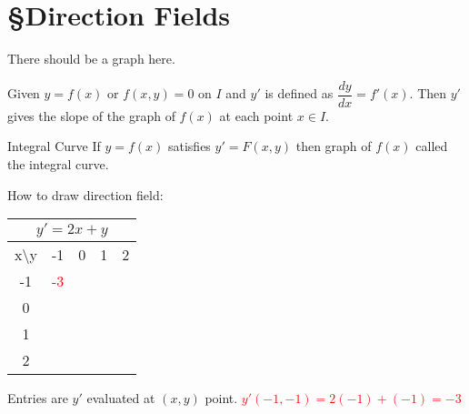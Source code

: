 \section{\S Direction Fields}
\begin{note}
There should be a graph here.
\end{note}
Given $y=f(x)$ or $f(x,y)=0$ on $I$ and $y'$ is defined as $\dfrac{dy}{dx}=f'(x)$. Then $y'$ gives the slope of the graph of $f(x)$ at each point $x \in I$.
\begin{imp:defn}{Integral Curve}{} If $y=f(x)$ satisfies $y'=F(x,y)$ then graph of $f(x)$ called the integral curve.
\end{imp:defn}
\begin{ex}
How to draw direction field:
\begin{center}
 \begin{tabular}{|c||c|c|c|c|} 
 \hline
 \multicolumn{5}{|c|}{$y'=2x+y$} \\
 \hline
 x\backslash y & -1 & 0 & 1 & 2\\
 \hline\hline
 -1 & \textcolor{red}{-3} &  &  &  \\ 
 \hline
 0 &  &  &  &  \\
 \hline
 1 &  &  &  &  \\
 \hline
 2 &  &  &  &  \\
 \hline
\end{tabular}
\end{center}
Entries are $y'$ evaluated at $(x,y)$ point. \textcolor{red}{$y'(-1,-1)=2(-1)+(-1)=-3$}


 \begin{figure}[h!]

    \begin{subfigure}{\textwidth}
    
    \end{subfigure}

\end{figure}
\end{ex}